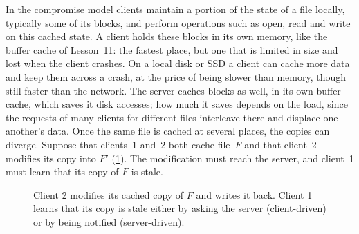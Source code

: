 \documentclass[../main.tex]{subfiles}
\begin{document}
In the compromise model clients maintain a portion of the state of a file
locally, typically some of its blocks, and perform operations such as
open, read and write on this cached state.  A client holds these
blocks in its own memory, like the buffer cache of Lesson~11: the fastest
place, but one that is limited in size and lost when the client
crashes.  On a local disk or SSD a
client can cache more data and keep them across a crash, at the price of
being slower than memory, though still faster than the
network.  The
server caches blocks as well, in its own buffer cache, which saves it disk
accesses; how much it saves depends on the load, since the requests of
many clients for different files interleave there and displace one
another's data.  Once the same
file is cached at several places, the copies can diverge.  Suppose that clients~1 and~2 both cache file~$F$ and
that client~2 modifies its copy into $F'$ (\cref{fig:l14-caching}).  The
modification must reach the server, and client~1 must learn that its copy
of $F$ is stale.

\begin{figure}[htbp]
  \centering
  
  \caption{Client 2 modifies its cached copy of $F$ and writes it back.
    Client 1 learns that its copy is stale either by asking the server
    (client-driven) or by being notified (server-driven).}
  \label{fig:l14-caching}
\end{figure}
\end{document}
